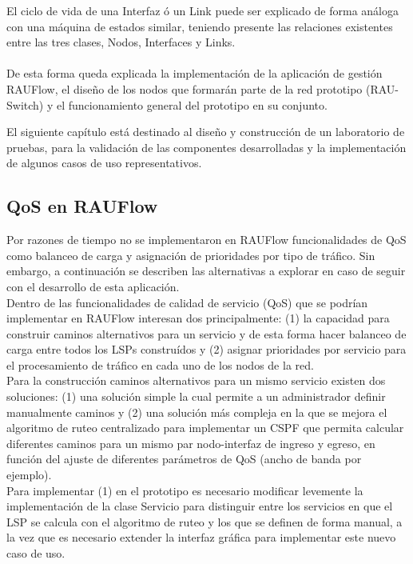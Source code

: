 El ciclo de vida de una Interfaz \'o un Link puede ser explicado de forma an\'aloga con una m\'aquina de estados similar, teniendo presente las relaciones existentes entre las tres clases, Nodos, Interfaces y Links.\\ \\

De esta forma queda explicada la implementaci\'on de la aplicaci\'on de gesti\'on RAUFlow, el diseño de  los nodos que formar\'an parte de la red prototipo (RAU-Switch) y el funcionamiento general del prototipo en su conjunto. 

El siguiente cap\'itulo est\'a destinado al diseño y construcción de un laboratorio de pruebas, para la validaci\'on de las componentes desarrolladas y la implementaci\'on de algunos casos de uso representativos. 

\subsection{QoS en RAUFlow}
Por razones de tiempo no se implementaron en RAUFlow funcionalidades de QoS como balanceo de carga y asignaci\'on de prioridades por tipo de tr\'afico. Sin embargo, a continuaci\'on se describen las alternativas a explorar en caso de seguir con el desarrollo de esta aplicaci\'on.\\

Dentro de las funcionalidades de calidad de servicio (QoS) que se podrían implementar en RAUFlow interesan dos principalmente: (1) la capacidad para construir caminos alternativos para un servicio y  de esta forma hacer balanceo de carga entre todos los LSPs constru\'idos y (2) asignar prioridades por servicio para el procesamiento de tr\'afico en cada uno de los nodos de la red.\\

Para la construcci\'on caminos alternativos para un mismo servicio existen dos soluciones: (1) una soluci\'on simple la cual permite a un administrador definir manualmente caminos y (2) una soluci\'on m\'as compleja en la que se mejora el algoritmo de ruteo centralizado para implementar un CSPF que permita calcular diferentes caminos para un mismo par nodo-interfaz de ingreso y egreso, en funci\'on del ajuste de diferentes par\'ametros de QoS (ancho de banda por ejemplo).\\

Para implementar (1) en el prototipo es necesario modificar levemente la implementaci\'on de la clase Servicio para distinguir entre los servicios en que el LSP se calcula con el algoritmo de ruteo y los que se definen de forma manual, a la vez que es necesario extender la interfaz gr\'afica para implementar este nuevo caso de uso.

